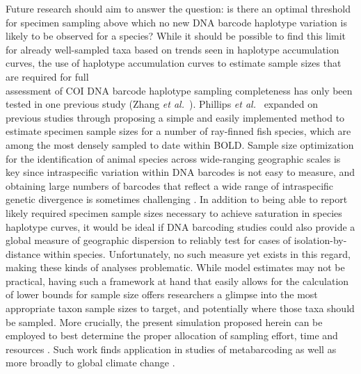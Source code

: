 Future research should aim to answer the question: is there an optimal threshold for specimen sampling above which no new DNA barcode haplotype variation is likely to be observed for a species? While it should be possible to find this limit for already well-sampled taxa based on trends seen in haplotype accumulation curves, the use of haplotype accumulation curves to estimate sample sizes that are required for full \\ assessment of COI DNA barcode haplotype sampling completeness has only been tested in one previous study (Zhang \textit{et al.}~\cite{zhang2010estimating}). Phillips \textit{et al.}~\cite{phillips2015exploration} expanded on previous studies through proposing a simple and easily implemented method to estimate specimen sample sizes for a number of ray-finned fish species, which are among the most densely sampled to date within BOLD. Sample size optimization for the identification of animal species across wide-ranging geographic scales is key since intraspecific variation within DNA barcodes is not easy to measure, and obtaining large numbers of barcodes that reflect a wide range of intraspecific genetic divergence is sometimes challenging \cite{bertolazzi2009learning}. In addition to being able to report likely required specimen sample sizes necessary to achieve saturation in species haplotype curves, it would be ideal if DNA barcoding studies could also provide a global measure of geographic dispersion to reliably test for cases of isolation-by-distance within species. Unfortunately, no such measure yet exists in this regard, making these kinds of analyses problematic. While model estimates may not be practical, having such a framework at hand that easily allows for the calculation of lower bounds for sample size offers researchers a glimpse into the most appropriate taxon sample sizes to target, and potentially where those taxa should be sampled. More crucially, the present simulation proposed herein can be employed to best determine the proper allocation of sampling effort, time and resources \cite{hortal2005ed}. Such work finds application in studies of metabarcoding \cite{wares2015can} as well as more broadly to global climate change \cite{pfenninger2012methodological}.




